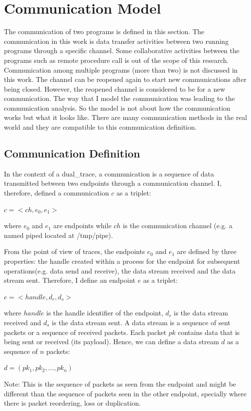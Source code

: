 \section{Communication Model}\label{definition}
The communication of two programs is defined in this section. The communication in this work is data transfer activities between two running programs through a specific channel. Some collaborative activities between the programs such as remote procedure call is out of the scope of this research. Communication among multiple programs (more than two) is not discussed in this work. The channel can be reopened again to start new communications after being closed. However, the reopened channel is considered to be for a new communication. The way that I model the communication was leading to the communication analysis. So the model is not about how the communication works but what it looks like. There are many communication methods in the real world and they are compatible to this communication definition. 

\subsection{Communication Definition}
In the context of a dual\_trace, a communication is a sequence of data transmitted between two endpoints through a communication channel. I, therefore, defined a communication $c$ as a triplet:

$c =<ch, e_0, e_1>$

where $e_0$ and $e_1$ are endpoints while $ch$ is the communication channel (e.g. a named piped located at /tmp/pipe).

From the point of view of traces, the endpoints $e_0$ and $e_1$ are defined by three properties: the handle created within a process for the endpoint for subsequent operations(e.g. data send and receive), the data stream received and the data stream sent. Therefore, I define an endpoint $e$ as a triplet:

$ e =<handle, d_r, d_s>$

where $handle$ is the handle identifier of the endpoint, $d_r$ is the data stream received and $d_s$ is the data stream sent. A data stream is a sequence of sent packets or a sequence of received packets. Each packet $pk$ contains data that is being sent or received (its payload). Hence, we can define a data stream $d$ as a sequence of $n$ packets:

$ d = (pk_1, pk_2, ..., pk_n)$ 

Note: This is the sequence of packets as seen from the endpoint and might be different than the sequence of packets seen in the other endpoint, specially where there is packet reordering, loss or duplication.

